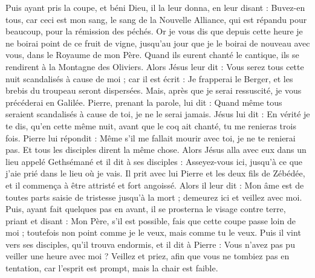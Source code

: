 \begin{multicols}{2}
Puis ayant pris la coupe, et béni Dieu, il la leur donna, en leur disant : Buvez-en tous,
car ceci est mon sang, le sang de la Nouvelle Alliance, qui est répandu pour beaucoup, pour la rémission des péchés.
Or je vous dis que depuis cette heure je ne boirai point de ce fruit de vigne, jusqu'au jour que je le boirai de nouveau avec vous, dans le Royaume de mon Père.
Quand ils eurent chanté le cantique, ils se rendirent à la Montagne des Oliviers.
Alors Jésus leur dit : Vous serez tous cette nuit scandalisés à cause de moi ; car il est écrit : Je frapperai le Berger, et les brebis du troupeau seront dispersées.
Mais, après que je serai ressuscité, je vous précéderai en Galilée.
Pierre, prenant la parole, lui dit : Quand même tous seraient scandalisés à cause de toi, je ne le serai jamais.
Jésus lui dit : En vérité je te dis, qu'en cette même nuit, avant que le coq ait chanté, tu me renieras trois fois.
Pierre lui répondit : Même s'il me fallait mourir avec toi, je ne te renierai pas. Et tous les disciples dirent la même chose.
Alors Jésus alla avec eux dans un lieu appelé Gethsémané et il dit à ses disciples : Asseyez-vous ici, jusqu'à ce que j'aie prié dans le lieu où je vais.
Il prit avec lui Pierre et les deux fils de Zébédée, et il commença à être attristé et fort angoissé.
Alors il leur dit : Mon âme est de toutes parts saisie de tristesse jusqu'à la mort ; demeurez ici et veillez avec moi.
Puis, ayant fait quelques pas en avant, il se prosterna le visage contre terre, priant et disant : Mon Père, s'il est possible, fais que cette coupe passe loin de moi ; toutefois non point comme je le veux, mais comme tu le veux.
Puis il vint vers ses disciples, qu'il trouva endormis, et il dit à Pierre : Vous n'avez pas pu veiller une heure avec moi ?
Veillez et priez, afin que vous ne tombiez pas en tentation, car l'esprit est prompt, mais la chair est faible.

\end{multicols}
